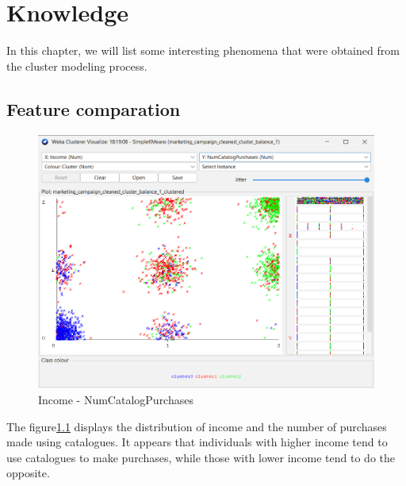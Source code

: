 \chapter{Knowledge}

In this chapter, we will list some interesting phenomena that were obtained from the cluster modeling process.

\section{Feature comparation}



\begin{figure}[H]
  \includegraphics[scale=0.6]{imgs/cluster_income_catalog}
  \centering
  \caption{Income - NumCatalogPurchases}
  \label{NumCatalogPurchases}
\end{figure}

The figure\ref{NumCatalogPurchases} displays the distribution of income and the number of purchases made using catalogues. It appears that individuals with higher income tend to use catalogues to make purchases, while those with lower income tend to do the opposite.


